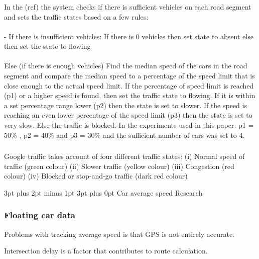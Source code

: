 \documentclass[12pt,a4paper]{article}
\makeatletter
\renewcommand\subsection{\@startsection {subsection}{1}{2mm} %
                               {3pt plus 2pt minus 1pt} %
                               {3pt plus 0pt} %
                               {\normalfont\bfseries}}
\makeatother
\begin{document}
\subsubsection{}
In the (ref) the system checks if there is sufficient vehicles on each road segment and sets the traffic states based on a few rules:
\paragraph{}
- If there is insufficient vehicles:
If there is 0 vehicles then set state to absent
else then set the state to flowing

\paragraph{}
Else (if there is enough vehicles)
  Find the median speed of the cars in the road segment and compare the median speed to a percentage of the speed limit that is close enough to the actual speed limit.
  If the percentage of speed limit is reached (p1) or a higher speed is found, then set the traffic state to flowing.
  If it is within a set percentage range lower (p2) then the state is set to slower.
  If the speed is reaching an even lower percentage of the speed limit (p3) then the state is set to very slow.
  Else the traffic is blocked.
  In the experiments used in this paper: p1 = 50\% , p2 = 40\% and p3 = 30\% and the sufficient number of cars was set to 4.
  
  \subsubsection{}
  Google traffic takes account of four different traffic states: 
  (i) Normal speed of traffic (green colour)
  (ii) Slower traffic (yellow colour)
  (iii) Congestion (red colour)
  (iv) Blocked or stop-and-go traffic (dark red colour)

\subsection{Car average speed Research}

\subsubsection{Floating car data}
Problems with tracking average speed is that GPS is not entirely accurate. \cite{Jia}

Intersection delay is a factor that contributes to route calculation. \cite{Liu}
\end{document}
